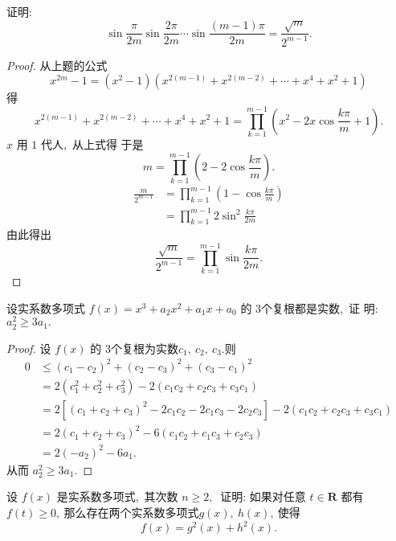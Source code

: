 \begin{problem}
	证明:
	$$\sin \frac{\pi}{2 m} \sin \frac{2 \pi}{2 m} \cdots \sin \frac{(m-1) \pi}{2 m}=\frac{\sqrt{m}}{2^{m-1}} .$$
\end{problem}
\begin{proof}
	从上题的公式
	$$x^{2 m}-1=\left(x^{2}-1\right)\left(x^{2(m-1)}+x^{2(m-2)}+\cdots+x^{4}+x^{2}+1\right)$$
	得
	$$x^{2(m-1)}+x^{2(m-2)}+\cdots+x^{4}+x^{2}+1=\prod_{k=1}^{m-1}\left(x^{2}-2 x \cos \frac{k \pi}{m}+1\right) .$$
	$x $ 用 $1$ 代人,\  从上式得
	于是
	$$m=\prod_{k=1}^{m-1}\left(2-2 \cos \frac{k \pi}{m}\right) .$$
	$$\begin{aligned}
		\frac{m}{2^{m-1}} & =\prod_{k=1}^{m-1}\left(1-\cos \frac{k \pi}{m}\right) \\
		& =\prod_{k=1}^{m-1} 2 \sin ^{2} \frac{k \pi}{2 m}
	\end{aligned}$$
	由此得出
	$$\frac{\sqrt{m}}{2^{m-1}}=\prod_{k=1}^{m-1} \sin \frac{k \pi}{2 m} .$$
\end{proof}
\newpage
\begin{problem}
	设实系数多项式  $f(x)=x^{3}+a_{2} x^{2}+a_{1} x+a_{0}$  的 $3 $个复根都是实数,\  证 明:$  a_{2}^{2} \geqslant 3 a_{1}  .$
\end{problem}
\begin{proof}
	设 $ f(x)$  的 $3 $个复根为实数$  c_{1},\  c_{2},\  c_{3}  .$则
	$$\begin{aligned}
		0 & \leqslant\left(c_{1}-c_{2}\right)^{2}+\left(c_{2}-c_{3}\right)^{2}+\left(c_{3}-c_{1}\right)^{2} \\
		& =2\left(c_{1}^{2}+c_{2}^{2}+c_{3}^{2}\right)-2\left(c_{1} c_{2}+c_{2} c_{3}+c_{3} c_{1}\right) \\
		& =2\left[\left(c_{1}+c_{2}+c_{3}\right)^{2}-2 c_{1} c_{2}-2 c_{1} c_{3}-2 c_{2} c_{3}\right]-2\left(c_{1} c_{2}+c_{2} c_{3}+c_{3} c_{1}\right) \\
		& =2\left(c_{1}+c_{2}+c_{3}\right)^{2}-6\left(c_{1} c_{2}+c_{1} c_{3}+c_{2} c_{3}\right) \\
		& =2\left(-a_{2}\right)^{2}-6 a_{1} .
	\end{aligned}$$
	从而  $a_{2}^{2} \geqslant 3 a_{1}  .$
\end{proof}
\newpage
\begin{problem}
	设 $ f(x) $ 是实系数多项式,\  其次数  $n \geqslant 2 ,\ $ 证明: 如果对任意 $ t \in \mathbf{R} $ 都有 $ f(t) \geqslant 0 ,\  $那么存在两个实系数多项式$  g(x),\  h(x) ,\  $使得
	$$f(x)=g^{2}(x)+h^{2}(x) .$$
\end{problem}
